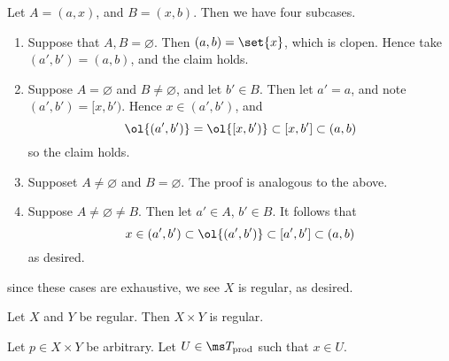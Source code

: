 \documentclass{fkpset}
\begin{document}
\begin{solution}
\begin{enumerate}[label=(\arabic*)]
        Let $A = (a, x)$, and $B = (x, b)$. Then we have four
        subcases.
        \begin{enumerate}[label=\roman*)]
          \item Suppose that $A,B = \varnothing$. Then $(a,b) =
            \set{x}$, which is clopen. Hence take $(a',b') = (a,b)$,
            and the claim holds. \cmark
          \item Suppose $A = \varnothing$ and $B \neq \varnothing$,
            and let $b' \in B$. Then let $a'=a$, and note $(a',b') =
            [x, b')$. Hence $x \in (a',b')$, and
            \[
              \ol{(a', b')} = \ol{[x, b')} \subset [x,b'] \subset
              (a,b)
            \]
            so the claim holds. \cmark
          \item Supposet $A \neq \varnothing$ and $B = \varnothing$.
            The proof is analogous to the above. \cmark
          \item Suppose $A \neq \varnothing \neq B$. Then let $a' \in
            A$, $b' \in B$. It follows that
            \[
              x \in (a',b') \subset \ol{(a',b')} \subset [a',b']
              \subset (a,b)
            \]
            as desired. \cmark
        \end{enumerate}
        since these cases are exhaustive, we see $X$ is regular, as
        desired.
    \end{enumerate}
  \end{solution}
  \clearpage

  \begin{problem}[5.17]
    Let $X$ and $Y$ be regular. Then $X \times Y$ is regular.
  \end{problem}
  \begin{solution}
    Let $p \in X \times Y$ be arbitrary. Let $U \in \ms T_{\rm prod}$
    such that $x \in U$.
  \end{solution}
  \clearpage
\end{document}
